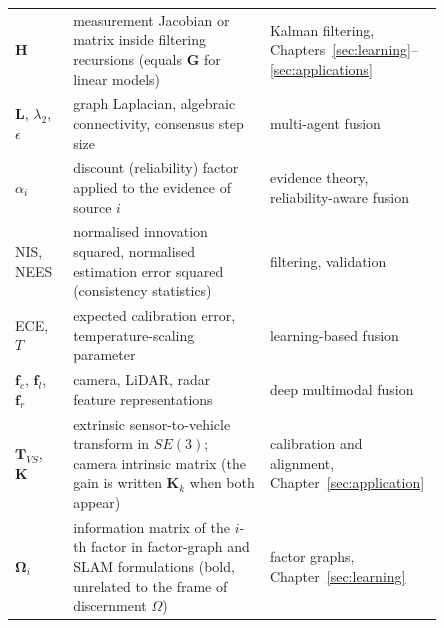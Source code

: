 \begin{table}[!t]
\begin{tabular}{p{0.13\linewidth} p{0.44\linewidth} p{0.28\linewidth}}
        $\mathbf{H}$ & measurement Jacobian or matrix inside filtering recursions (equals $\mathbf{G}$ for linear models) & Kalman filtering, Chapters~\ref{sec:learning}--\ref{sec:applications} \\
        $\mathbf{L}$, $\lambda_2$, $\epsilon$ & graph Laplacian, algebraic connectivity, consensus step size & multi-agent fusion \\
        $\alpha_i$ & discount (reliability) factor applied to the evidence of source $i$ & evidence theory, reliability-aware fusion \\
        NIS, NEES & normalised innovation squared, normalised estimation error squared (consistency statistics) & filtering, validation \\
        ECE, $T$ & expected calibration error, temperature-scaling parameter & learning-based fusion \\
        $\mathbf{f}_c$, $\mathbf{f}_l$, $\mathbf{f}_r$ & camera, LiDAR, radar feature representations & deep multimodal fusion \\
        $\mathbf{T}_{VS}$, $\mathbf{K}$ & extrinsic sensor-to-vehicle transform in $SE(3)$; camera intrinsic matrix (the gain is written $\mathbf{K}_k$ when both appear) & calibration and alignment, Chapter~\ref{sec:application} \\
        $\mathbf{\Omega}_i$ & information matrix of the $i$-th factor in factor-graph and SLAM formulations (bold, unrelated to the frame of discernment $\Omega$) & factor graphs, Chapter~\ref{sec:learning} \\
        \hline
    \end{tabular}
\end{table}

